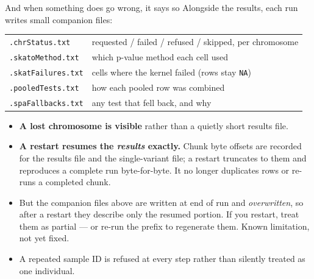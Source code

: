\documentclass[aspectratio=169,11pt]{beamer}
\begin{document}
\begin{frame}{And when something does go wrong, it says so}
Alongside the results, each run writes small companion files:

\medskip
\begin{center}\small
\begin{tabular}{ll}
\toprule
\texttt{.chrStatus.txt} & requested / failed / refused / skipped, per chromosome \\
\texttt{.skatoMethod.txt} & which p-value method each cell used \\
\texttt{.skatFailures.txt} & cells where the kernel failed (rows stay \texttt{NA}) \\
\texttt{.pooledTests.txt} & how each pooled row was combined \\
\texttt{.spaFallbacks.txt} & any test that fell back, and why \\
\bottomrule
\end{tabular}
\end{center}

\medskip
\begin{itemize}
  \item \textbf{A lost chromosome is visible} rather than a quietly short results
        file.
  \item \textbf{A restart resumes the \emph{results} exactly.} Chunk byte offsets
        are recorded for the results file and the single-variant file; a restart
        truncates to them and reproduces a complete run byte-for-byte. It no
        longer duplicates rows or re-runs a completed chunk.
  \item \alert{But the companion files above are written at end of run and
        \emph{overwritten}, so after a restart they describe only the resumed
        portion.} If you restart, treat them as partial --- or re-run the prefix
        to regenerate them. Known limitation, not yet fixed.
  \item A repeated sample ID is refused at every step rather than silently treated
        as one individual.
\end{itemize}
\end{frame}
\end{document}
